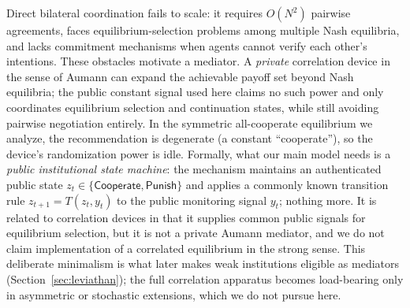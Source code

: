 \documentclass[manuscript,screen,review]{jair}
\begin{document}
Direct bilateral coordination fails to scale: it requires $O(N^2)$ pairwise agreements, faces equilibrium-selection problems among multiple Nash equilibria, and lacks commitment mechanisms when agents cannot verify each other's intentions. These obstacles motivate a mediator. A \emph{private} correlation device in the sense of Aumann \cite{aumann.1974,aumann.1987} can expand the achievable payoff set beyond Nash equilibria; the public constant signal used here claims no such power and only coordinates equilibrium selection and continuation states, while still avoiding pairwise negotiation entirely. In the symmetric all-cooperate equilibrium we analyze, the recommendation is degenerate (a constant ``cooperate''), so the device's randomization power is idle. Formally, what our main model needs is a \emph{public institutional state machine}: the mechanism maintains an authenticated public state $z_t \in \{\mathsf{Cooperate}, \mathsf{Punish}\}$ and applies a commonly known transition rule $z_{t+1} = T(z_t, y_t)$ to the public monitoring signal $y_t$; nothing more. It is related to correlation devices in that it supplies common public signals for equilibrium selection, but it is not a private Aumann mediator, and we do not claim implementation of a correlated equilibrium in the strong sense. This deliberate minimalism is what later makes weak institutions eligible as mediators (Section~\ref{sec:leviathan}); the full correlation apparatus becomes load-bearing only in asymmetric or stochastic extensions, which we do not pursue here.
\end{document}
